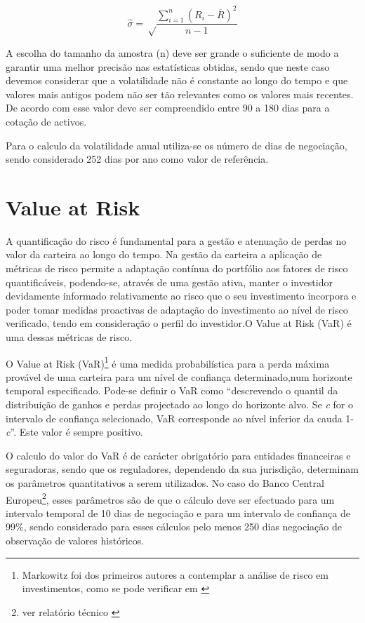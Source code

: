 \documentclass[
  12pt,
  a4paper,
  openany]{book}
\begin{document}
\begin{equation} 
  \hat{\sigma} = \sqrt\frac{\displaystyle\sum_{i=1}^n (R_i-\overline{R})^2}{n-1}
  \label{eq:estdesviopadrao}
\end{equation}

A escolha do tamanho da amostra (n) deve ser grande o suficiente de modo a garantir uma melhor precisão nas estatísticas obtidas, sendo que neste caso devemos considerar que a volatilidade não é constante ao longo do tempo e que valores mais antigos podem não ser tão relevantes como os valores mais recentes. De acordo com \citep{Hull2018} esse valor deve ser compreendido entre 90 a 180 dias para a cotação de activos.

Para o calculo da volatilidade anual utiliza-se os número de dias de negociação, sendo considerado 252 dias por ano como valor de referência.

\hypertarget{value-at-risk}{%
\section{Value at Risk}\label{value-at-risk}}

A quantificação do risco é fundamental para a gestão e atenuação de perdas no valor da carteira ao longo do tempo. Na gestão da carteira a aplicação de métricas de risco permite a adaptação contínua do portfólio aos fatores de risco quantificáveis, podendo-se, através de uma gestão ativa, manter o investidor devidamente informado relativamente ao risco que o seu investimento incorpora e poder tomar medidas proactivas de adaptação do investimento ao nível de risco verificado, tendo em consideração o perfil do investidor.O Value at Risk (VaR) é uma dessas métricas de risco.

O Value at Risk (VaR)\footnote{Markowitz foi dos primeiros autores a contemplar a análise de risco em investimentos, como se pode verificar em \citet{Markowitz1952}} é uma medida probabilística para a perda máxima provável de uma carteira para um nível de confiança determinado,num horizonte temporal especificado. Pode-se definir o VaR como ``descrevendo o quantil da distribuição de ganhos e perdas projectado ao longo do horizonte alvo. Se \emph{c} for o intervalo de confiança selecionado, VaR corresponde ao nível inferior da cauda 1-\emph{c}''\citep[pp.17]{philippe}. Este valor é sempre positivo.

O calculo do valor do VaR é de carácter obrigatório para entidades financeiras e seguradoras, sendo que os reguladores, dependendo da sua jurisdição, determinam os parâmetros quantitativos a serem utilizados.
No caso do Banco Central Europeu\footnote{ver relatório técnico \citet{ecb}}, esses parâmetros são de que o cálculo deve ser efectuado para um intervalo temporal de 10 dias de negociação e para um intervalo de confiança de 99\%, sendo considerado para esses cálculos pelo menos 250 dias negociação de observação de valores históricos.
\end{document}
